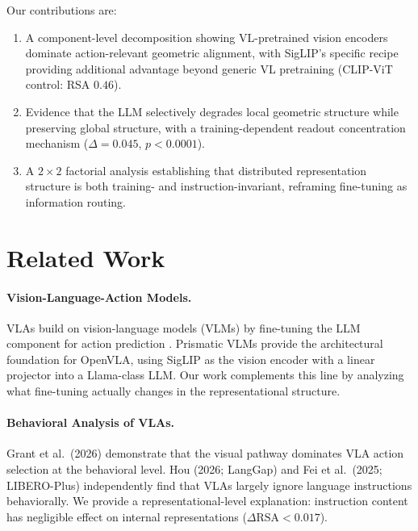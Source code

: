 \documentclass[letterpaper]{article}
\begin{document}
Our contributions are:
\begin{enumerate}
  \item A component-level decomposition showing VL-pretrained vision encoders dominate action-relevant geometric alignment, with SigLIP's specific recipe providing additional advantage beyond generic VL pretraining (CLIP-ViT control: RSA $0.46$).
  \item Evidence that the LLM selectively degrades local geometric structure while preserving global structure, with a training-dependent readout concentration mechanism ($\Delta{=}0.045$, $p{<}0.0001$).
  \item A $2{\times}2$ factorial analysis establishing that distributed representation structure is both training- and instruction-invariant, reframing fine-tuning as information routing.
\end{enumerate}

\section{Related Work}

\paragraph{Vision-Language-Action Models.}
VLAs build on vision-language models (VLMs) by fine-tuning the LLM component for action prediction \citep{brohan2023rt2,kim2024openvla}.
Prismatic VLMs \citep{karamcheti2024prismatic} provide the architectural foundation for OpenVLA, using SigLIP as the vision encoder with a linear projector into a Llama-class LLM.
Our work complements this line by analyzing what fine-tuning actually changes in the representational structure.

\paragraph{Behavioral Analysis of VLAs.}
Grant et al.\ (2026) demonstrate that the visual pathway dominates VLA action selection at the behavioral level.
Hou (2026; LangGap) and Fei et al.\ (2025; LIBERO-Plus) independently find that VLAs largely ignore language instructions behaviorally.
We provide a representational-level explanation: instruction content has negligible effect on internal representations ($\Delta \text{RSA} < 0.017$).
\end{document}
